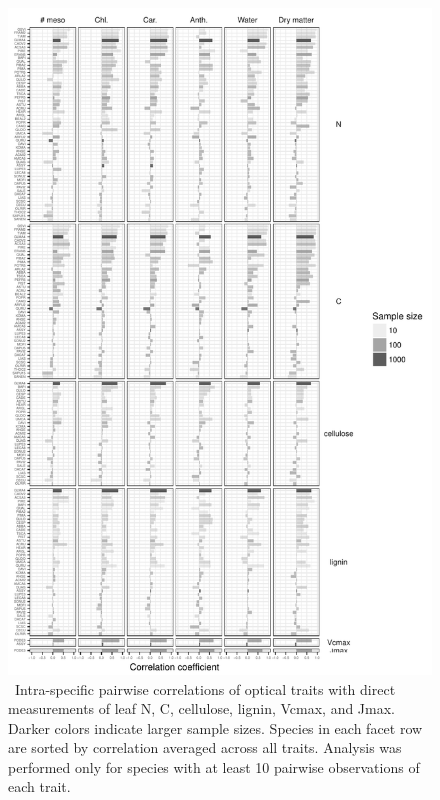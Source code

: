 \begin{figure}
  \includegraphics[width=\textwidth]{figures/trait_correlations_areabars.pdf}
  \caption{\
    Intra-specific pairwise correlations of optical traits with direct measurements of
    leaf N, C, cellulose, lignin, Vcmax, and Jmax.
    Darker colors indicate larger sample sizes.
    Species in each facet row are sorted by correlation averaged across all traits.
    Analysis was performed only for species with at least 10 pairwise observations of each trait.
% 
% 
  }\label{fig:trait_correlations}
\end{figure}

